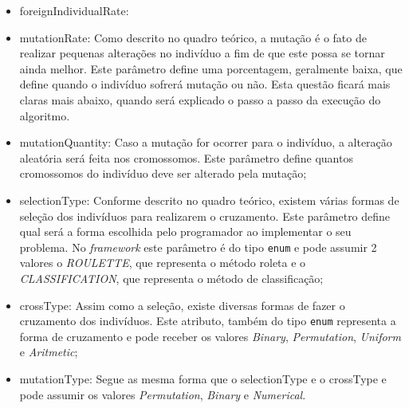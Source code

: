 \begin{itemize}
\begin{itemize}
			 \item{foreignIndividualRate}:
				 
				 
			 \item{mutationRate}:
				 Como descrito no quadro teórico, a mutação é o fato de realizar pequenas alterações no indivíduo a fim de que este possa se tornar ainda melhor. Este parâmetro define uma porcentagem, geralmente baixa, que define quando o indivíduo sofrerá mutação ou não. Esta questão ficará mais claras mais abaixo, quando será explicado o passo a passo da execução do algoritmo.
				 
			  \item{mutationQuantity}:
				  Caso a mutação for ocorrer para o indivíduo, a alteração aleatória será feita nos cromossomos. Este parâmetro define quantos cromossomos do indivíduo deve ser alterado pela mutação;
				  
			  \item{selectionType}:
				  Conforme descrito no quadro teórico, existem várias formas de seleção dos indivíduos para realizarem o cruzamento. Este parâmetro define qual será a forma escolhida pelo programador ao implementar o seu problema. No \textit{framework} este parâmetro é do tipo \texttt{enum} e pode assumir 2 valores o \textit{ROULETTE}, que representa o método roleta e o \textit{CLASSIFICATION}, que representa o método de classificação;
				  
			 \item{crossType}:
				 Assim como a seleção, existe diversas formas de fazer o cruzamento dos indivíduos. Este atributo, também do tipo \texttt{enum} representa a forma de cruzamento e pode receber os valores \textit{Binary}, \textit{Permutation}, \textit{Uniform} e \textit{Aritmetic};
				 
			 \item{mutationType}:
				 Segue as mesma forma que o selectionType e o crossType e pode assumir os valores \textit{Permutation}, \textit{Binary} e \textit{Numerical}.
 			
 		\end{itemize}
 	

\end{itemize}
